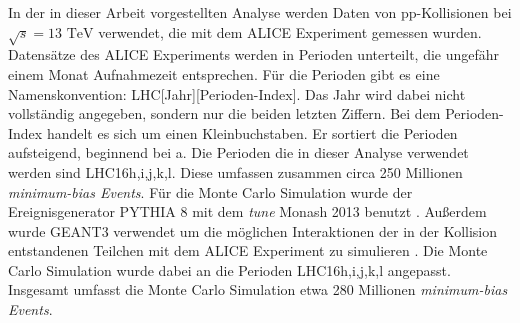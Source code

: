In der in dieser Arbeit vorgestellten Analyse werden Daten von pp-Kollisionen bei $\sqrt{s}=13\text{ TeV}$ verwendet, die mit dem ALICE Experiment gemessen wurden.
Datensätze des ALICE Experiments werden in Perioden unterteilt, die ungefähr einem Monat Aufnahmezeit entsprechen.
Für die Perioden gibt es eine Namenskonvention: LHC[Jahr][Perioden-Index].
Das Jahr wird dabei nicht vollständig angegeben, sondern nur die beiden letzten Ziffern.
Bei dem Perioden-Index handelt es sich um einen Kleinbuchstaben.
Er sortiert die Perioden aufsteigend, beginnend bei a.
Die Perioden die in dieser Analyse verwendet werden sind LHC16h,i,j,k,l.
Diese umfassen zusammen circa 250 Millionen \textit{minimum-bias Events}.
\newline
Für die Monte Carlo Simulation wurde der Ereignisgenerator PYTHIA 8 mit dem \textit{tune} Monash 2013 benutzt \cite{thesis:Krissy}.
Außerdem wurde GEANT3 verwendet um die möglichen Interaktionen der in der Kollision entstandenen Teilchen mit dem ALICE Experiment zu simulieren \cite{Brun:118715}.
Die Monte Carlo Simulation wurde dabei an die  Perioden LHC16h,i,j,k,l angepasst.
Insgesamt umfasst die Monte Carlo Simulation etwa 280 Millionen \textit{minimum-bias Events}.